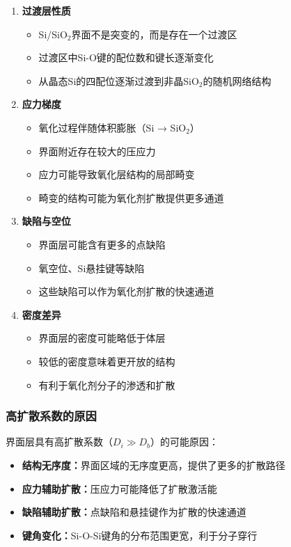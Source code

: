 \documentclass[UTF8,12pt,a4paper]{ctexart}
\begin{document}
\begin{enumerate}
    \item \textbf{过渡层性质}
    \begin{itemize}
        \item Si/SiO$_2$界面不是突变的，而是存在一个过渡区
        \item 过渡区中Si-O键的配位数和键长逐渐变化
        \item 从晶态Si的四配位逐渐过渡到非晶SiO$_2$的随机网络结构
    \end{itemize}
    
    \item \textbf{应力梯度}
    \begin{itemize}
        \item 氧化过程伴随体积膨胀（Si → SiO$_2$）
        \item 界面附近存在较大的压应力
        \item 应力可能导致氧化层结构的局部畸变
        \item 畸变的结构可能为氧化剂扩散提供更多通道
    \end{itemize}
    
    \item \textbf{缺陷与空位}
    \begin{itemize}
        \item 界面层可能含有更多的点缺陷
        \item 氧空位、Si悬挂键等缺陷
        \item 这些缺陷可以作为氧化剂扩散的快速通道
    \end{itemize}
    
    \item \textbf{密度差异}
    \begin{itemize}
        \item 界面层的密度可能略低于体层
        \item 较低的密度意味着更开放的结构
        \item 有利于氧化剂分子的渗透和扩散
    \end{itemize}
\end{enumerate}

\subsubsection{高扩散系数的原因}

界面层具有高扩散系数（$D_i \gg D_b$）的可能原因：

\begin{itemize}
    \item \textbf{结构无序度：}界面区域的无序度更高，提供了更多的扩散路径
    \item \textbf{应力辅助扩散：}压应力可能降低了扩散激活能
    \item \textbf{缺陷辅助扩散：}点缺陷和悬挂键作为扩散的快速通道
    \item \textbf{键角变化：}Si-O-Si键角的分布范围更宽，利于分子穿行
\end{itemize}
\end{document}
